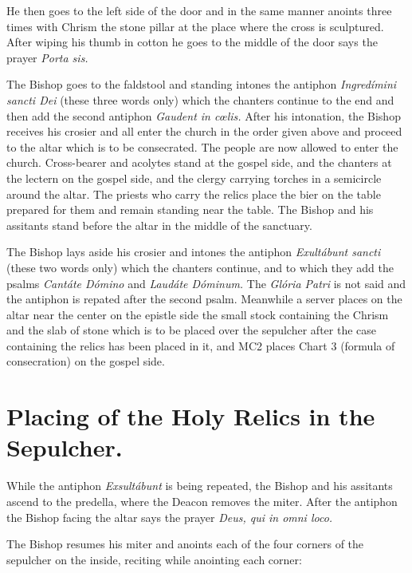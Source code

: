 \documentclass[letterpaper]{report}
\begin{document}
{    He then goes to the left side of the door and in the same manner anoints three
    times with Chrism the stone pillar at the place where the cross is sculptured.
    After wiping his thumb in cotton he goes to the middle of the door says the
    prayer \textit{Porta sis.}

    \rubric The Bishop goes to the faldstool and standing intones the antiphon
    \textit{Ingred\'imini sancti Dei} (these three words only) which the
    chanters continue to the end and then add the second antiphon
    \textit{Gaudent in c\oe lis.} After his intonation, the Bishop receives his
    crosier and all enter the church in the order given above and proceed to
    the altar which is to be consecrated. The people are now allowed to enter
    the church. Cross-bearer and acolytes stand at the gospel side, and the
    chanters at the lectern on the gospel side, and the clergy carrying torches
    in a semicircle around the altar. The priests who carry the relics place
    the bier on the table prepared for them and remain standing near the table.
    The Bishop and his assitants stand before the altar in the middle of the
    sanctuary.

    \rubric The Bishop lays aside his crosier and intones the antiphon
    \textit{Exult\'abunt sancti} (these two words only) which the chanters
    continue, and to which they add the psalms \textit{Cant\'ate D\'omino} and
    \textit{Laud\'ate D\'ominum.} The \textit{Gl\'oria Patri} is not said and
    the antiphon is repated after the second psalm. Meanwhile a server places
    on the altar near the center on the epistle side the small stock containing
    the Chrism and the slab of stone which is to be placed over the sepulcher
    after the case containing the relics has been placed in it, and MC2 places
    Chart 3 (formula of consecration) on the gospel side.

    \section{Placing of the Holy Relics in the Sepulcher.}

    \rubric While the antiphon \textit{Exsult\'abunt} is being repeated, the
    Bishop and his assitants ascend to the predella, where the Deacon removes
    the miter. After the antiphon the Bishop facing the altar says the prayer
    \textit{Deus, qui in omni loco.}

    \rubric The Bishop resumes his miter and anoints each of the four corners
    of the sepulcher on the inside, reciting while anointing each corner:

}
\end{document}
